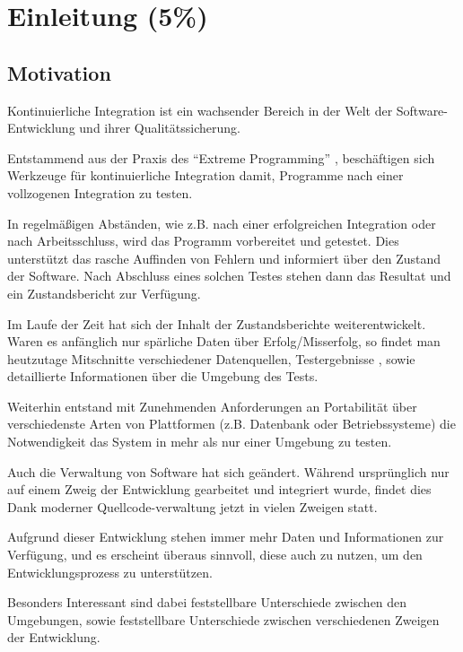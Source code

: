 \chapter{Einleitung (5\%) }
\label{chap:intro}
\section{Motivation}

Kontinuierliche Integration ist ein wachsender Bereich
in der Welt der Software-Entwicklung und ihrer Qualitätssicherung.

Entstammend aus der Praxis des ``Extreme Programming''
\cite{xp:explained, folwer:xp},
beschäftigen sich Werkzeuge für kontinuierliche Integration damit,
Programme nach einer vollzogenen Integration zu testen.

In regelmäßigen Abständen, wie z.B. nach einer erfolgreichen Integration oder nach Arbeitsschluss,
wird das Programm vorbereitet und getestet.
Dies unterst\"utzt das rasche Auffinden von Fehlern
und informiert \"uber den Zustand der Software.
Nach Abschluss eines solchen Testes stehen dann das Resultat
und ein Zustandsbericht zur Verf\"ugung.

Im Laufe der Zeit hat sich der Inhalt der Zustandsberichte weiterentwickelt.
Waren es anf\"anglich nur sp\"arliche Daten \"uber Erfolg/Misserfolg,
so findet man heutzutage Mitschnitte verschiedener Datenquellen, Testergebnisse
\cite{jenkins:junitxml}, sowie detaillierte Informationen \"uber die Umgebung des Tests.

Weiterhin entstand mit Zunehmenden Anforderungen an Portabilit\"at \"uber
verschiedenste Arten von Plattformen (z.B. Datenbank oder Betriebssysteme)
die Notwendigkeit das System in mehr als nur einer Umgebung zu testen.

Auch die Verwaltung von Software hat sich ge\"andert.
Während ursprünglich nur auf einem Zweig der Entwicklung gearbeitet und integriert wurde,
findet dies Dank moderner Quellcode-verwaltung jetzt in vielen Zweigen statt.
\cite{dvcs:vorteile, dvcs:entwicklungsmodelle}

Aufgrund dieser Entwicklung stehen immer mehr Daten und Informationen zur Verfügung,
und es erscheint überaus sinnvoll, diese auch zu nutzen, um den Entwicklungsprozess zu unterstützen.

Besonders Interessant sind dabei feststellbare Unterschiede zwischen den Umgebungen,
sowie feststellbare Unterschiede zwischen verschiedenen Zweigen der Entwicklung.

